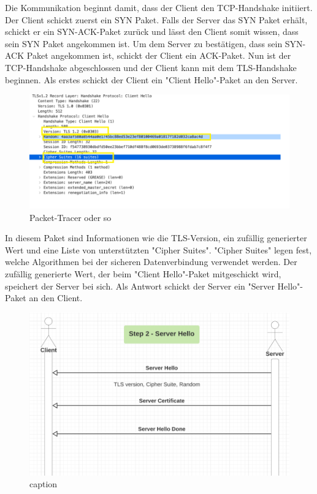 Die Kommunikation beginnt damit, dass der Client den TCP-Handshake initiiert. Der Client schickt zuerst ein SYN Paket. Falls der Server das SYN Paket erhält, schickt er ein SYN-ACK-Paket zurück und lässt den Client somit wissen, dass sein SYN Paket angekommen ist. Um dem Server zu bestätigen, dass sein SYN-ACK Paket angekommen ist, schickt der Client ein ACK-Paket. Nun ist der TCP-Handshake abgeschlossen und der Client kann mit dem TLS-Handshake beginnen. Als erstes schickt der Client ein "Client Hello"-Paket an den Server.

\begin{figure}[H]
    \centering
    \includegraphics{media/OpenSSL/pt.png}
    \caption{Packet-Tracer oder so} %
\end{figure}

In diesem Paket sind Informationen wie die TLS-Version, ein zufällig generierter Wert und eine Liste von unterstützten "Cipher Suites". "Cipher Suites" legen fest, welche Algorithmen bei der sicheren Datenverbindung verwendet werden. Der zufällig generierte Wert, der beim "Client Hello"-Paket mitgeschickt wird, speichert der Server bei sich. Als Antwort schickt der Server ein "Server Hello"-Paket an den Client. 

\begin{figure}[H]
    \centering
    \includegraphics{media/OpenSSL/hello.png}
    \caption{caption} %
\end{figure}

